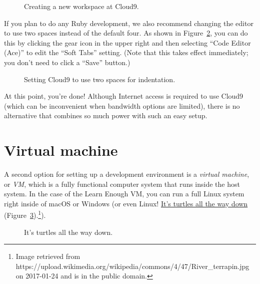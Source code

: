 \begin{figure}
\begin{center}
\end{center}
\caption{Creating a new workspace at Cloud9.\label{fig:cloud9_new_workspace}}
\end{figure}

If you plan to do any Ruby development, we also recommend changing the editor to use two spaces instead of the default four. As shown in Figure~\ref{fig:cloud9_two_spaces}, you can do this by clicking the gear icon in the upper right and then selecting ``Code Editor (Ace)'' to edit the ``Soft Tabs'' setting. (Note that this takes effect immediately; you don't need to click a ``Save'' button.)

\begin{figure}
\begin{center}
\end{center}
\caption{Setting Cloud9 to use two spaces for indentation.\label{fig:cloud9_two_spaces}}
\end{figure}

At this point, you're done! Although Internet access is required to use Cloud9 (which can be inconvenient when bandwidth options are limited), there is no alternative that combines so much power with such an easy setup.


\section{Virtual machine} %
\label{sec:virtual_machine}

A second option for setting up a development environment is a \emph{virtual machine}, or \emph{VM}, which is a fully functional computer system that runs inside the host system. In the case of the Learn Enough VM, you can run a full Linux system right inside of macOS or Windows (or even Linux! \href{https://en.wikipedia.org/wiki/Turtles_all_the_way_down}{It's turtles all the way down} (Figure~\ref{fig:turtles}).\footnote{Image retrieved from https://upload.wikimedia.org/wikipedia/commons/4/47/River\_terrapin.jpg on 2017-01-24 and is in the public domain.}).

\begin{figure}
\begin{center}
\end{center}
\caption{It's turtles all the way down.\label{fig:turtles}}
\end{figure}

